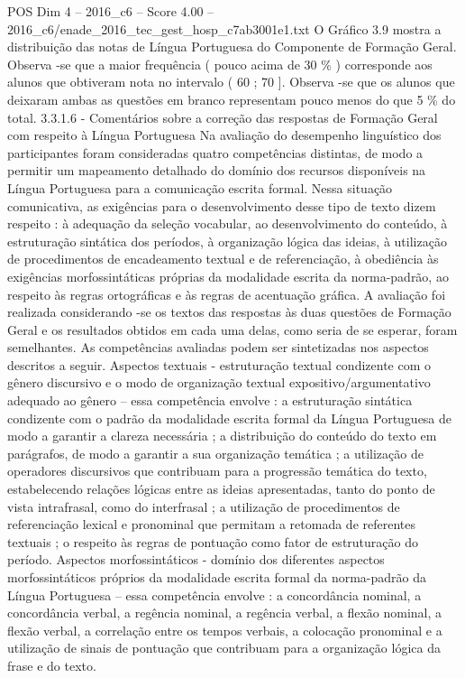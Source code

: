\begin{textsample}{POS Dim 4 – 2016\_c6 – Score 4.00 – 2016\_c6/enade\_2016\_tec\_gest\_hosp\_c7ab3001e1.txt}
O Gráfico 3.9 mostra a distribuição das notas de Língua Portuguesa do Componente de Formação Geral.
Observa -se que a maior frequência ( pouco acima de 30 \% ) corresponde aos alunos que obtiveram nota no intervalo ( 60 ; 70 ].
Observa -se que os alunos que deixaram ambas as questões em branco representam pouco menos do que 5 \% do total. 3.3.1.6 - Comentários sobre a correção das respostas de Formação Geral com respeito à Língua Portuguesa Na avaliação do desempenho linguístico dos participantes foram consideradas quatro competências distintas, de modo a permitir um mapeamento detalhado do domínio dos recursos disponíveis na Língua Portuguesa para a comunicação escrita formal.
Nessa situação comunicativa, as exigências para o desenvolvimento desse tipo de texto dizem respeito : à adequação da seleção vocabular, ao desenvolvimento do conteúdo, à estruturação sintática dos períodos, à organização lógica das ideias, à utilização de procedimentos de encadeamento textual e de referenciação, à obediência às exigências morfossintáticas próprias da modalidade escrita da norma-padrão, ao respeito às regras ortográficas e às regras de acentuação gráfica.
A avaliação foi realizada considerando -se os textos das respostas às duas questões de Formação Geral e os resultados obtidos em cada uma delas, como seria de se esperar, foram semelhantes.
As competências avaliadas podem ser sintetizadas nos aspectos descritos a seguir.
Aspectos textuais - estruturação textual condizente com o gênero discursivo e o modo de organização textual expositivo/argumentativo adequado ao gênero – essa competência envolve : a estruturação sintática condizente com o padrão da modalidade escrita formal da Língua Portuguesa de modo a garantir a clareza necessária ; a distribuição do conteúdo do texto em parágrafos, de modo a garantir a sua organização temática ; a utilização de operadores discursivos que contribuam para a progressão temática do texto, estabelecendo relações lógicas entre as ideias apresentadas, tanto do ponto de vista intrafrasal, como do interfrasal ; a utilização de procedimentos de referenciação lexical e pronominal que permitam a retomada de referentes textuais ; o respeito às regras de pontuação como fator de estruturação do período.
Aspectos morfossintáticos - domínio dos diferentes aspectos morfossintáticos próprios da modalidade escrita formal da norma-padrão da Língua Portuguesa – essa competência envolve : a concordância nominal, a concordância verbal, a regência nominal, a regência verbal, a flexão nominal, a flexão verbal, a correlação entre os tempos verbais, a colocação pronominal e a utilização de sinais de pontuação que contribuam para a organização lógica da frase e do texto.

\end{textsample}
